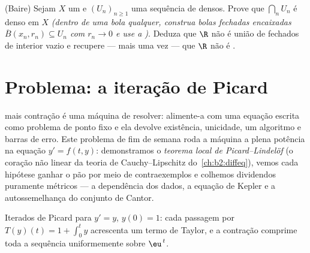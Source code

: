 \begin{exercise}[$\star\star\star$]\label{exo:b2:metric:12}
(Baire) Sejam $X$ um  e $(U_n)_{n\geq1}$ uma
sequência de  densos. Prove que $\bigcap_n U_n$ é
denso em $X$ \emph{(dentro de uma bola qualquer, construa bolas fechadas encaixadas
$\overline B(x_n, r_n) \subseteq U_n$ com $r_n \to 0$ e use a
)}. Deduza que $\R$ não é união  de
fechados de interior vazio e recupere --- mais uma vez --- que
$\R$ não é .
\end{exercise}

\section{Problema: a iteração de Picard}

 mais contração é uma máquina de resolver: alimente-a com uma
equação escrita como problema de ponto fixo e ela devolve
existência, unicidade, um algoritmo e barras de erro. Este problema de fim
de semana roda a máquina a plena potência na equação $y' = f(t,
y)$: demonstramos o \emph{teorema local de Picard--Lindelöf} (o
coração não linear da teoria de Cauchy--Lipschitz do~\cref{ch:b2:diffeq}),
vemos cada hipótese ganhar o pão por meio de
contraexemplos e colhemos dividendos puramente métricos ---
a dependência  dos dados, a equação de Kepler e a
autossemelhança do conjunto de Cantor.

\begin{omfigure}

{\small Iterados de Picard para $y' = y$, $y(0) = 1$: cada passagem
por $T(y)(t) = 1 + \int_0^t y$ acrescenta um termo de Taylor, e a
contração comprime toda a sequência uniformemente sobre
$\eu^{\,t}$.}
\end{omfigure}

